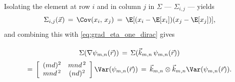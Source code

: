 Isolating the element at row $i$ and in column $j$ in $\Sigma$ --- $\Sigma_{i,j}$ --- yields
%
\begin{equation} \label{eq:covariance_matrix_element}
\Sigma_{i,j}(\vec{x}) \,=\, \Cov(x_i,\,x_j) \,=\, \E[(x_i - \E[x_i])(x_j - \E[x_j])],
\end{equation}
%
and combining this with \eqref{eq:grad_eta_one_dirac} gives
%
\begin{equation} \label{eq:covariance_matrix_gradient_eta_mn}
\renewcommand*{\arraystretch}{2}
\begin{array}{c}
\Sigma(\nabla\psi_{m,n}(\vec{r})) \,=\, \Sigma(\vec{k}_{m,n}\,\psi_{m,n}(\vec{r})) \\
=\,
\left[\renewcommand*{\arraystretch}{1}
\begin{array}{cc}
(md)^2 & mnd^{\,2} \\
mnd^{\,2} & (nd)^2
\end{array}
\right]
\Var(\psi_{m,n}(\vec{r})) \,=\, \vec{k}_{m,n}\otimes\vec{k}_{m,n} \Var(\psi_{m,n}(\vec{r})).
\end{array}
\end{equation}

